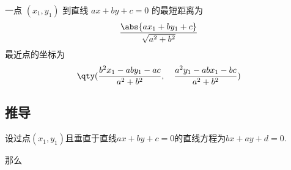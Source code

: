 
\begin{issues}
\issueDraft
\end{issues}

一点 $(x_1,y_1)$ 到直线 $ax + by + c = 0$ 的最短距离为
\begin{equation}
\frac{\abs{ax_1 + by_1 + c}}{\sqrt{a^2 + b^2}}
\end{equation}
最近点的坐标为
\begin{equation}
\qty(
\frac{b^2x_1 - aby_1 - ac}{a^2 + b^2}, \quad
\frac{a^2y_1 - abx_1 - bc}{a^2 + b^2})
\end{equation}

\subsection{推导}

设过点$(x_1,y_1)$且垂直于直线$ax+by+c=0$的直线方程为$bx+ay+d=0$.

那么


